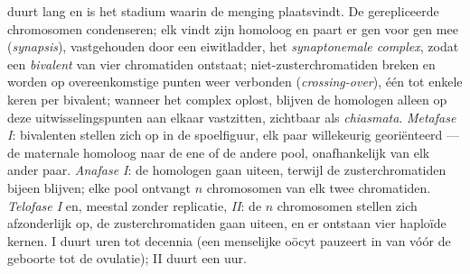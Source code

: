 \begin{proposition}[De stadia]\label{prop:b2:meiosis-heredity:stages}
\emph{} duurt lang en is het stadium waarin de menging
plaatsvindt. De gerepliceerde chromosomen condenseren; elk vindt zijn
homoloog en paart er gen voor gen mee (\emph{synapsis}), vastgehouden
door een eiwitladder, het \emph{synaptonemale complex}, zodat een
\emph{bivalent} van vier chromatiden ontstaat; niet-zusterchromatiden
breken en worden op overeenkomstige punten weer verbonden
(\emph{crossing-over}), één tot enkele keren per bivalent; wanneer het
complex oplost, blijven de homologen alleen op deze uitwisselingspunten
aan elkaar vastzitten, zichtbaar als \emph{chiasmata}.
\emph{Metafase I}: bivalenten stellen zich op in de spoelfiguur, elk paar
willekeurig georiënteerd --- de maternale homoloog naar de ene of de
andere pool, onafhankelijk van elk ander paar. \emph{Anafase I}: de
homologen gaan uiteen, terwijl de zusterchromatiden bijeen blijven; elke
pool ontvangt $n$ chromosomen van elk twee chromatiden. \emph{Telofase I}
en, meestal zonder replicatie, \emph{ II}: de $n$
chromosomen stellen zich afzonderlijk op, de zusterchromatiden gaan
uiteen, en er ontstaan vier haploïde kernen.  I duurt uren tot
decennia (een menselijke oöcyt pauzeert in  van vóór de geboorte
tot de ovulatie);  II duurt een uur.
\end{proposition}

